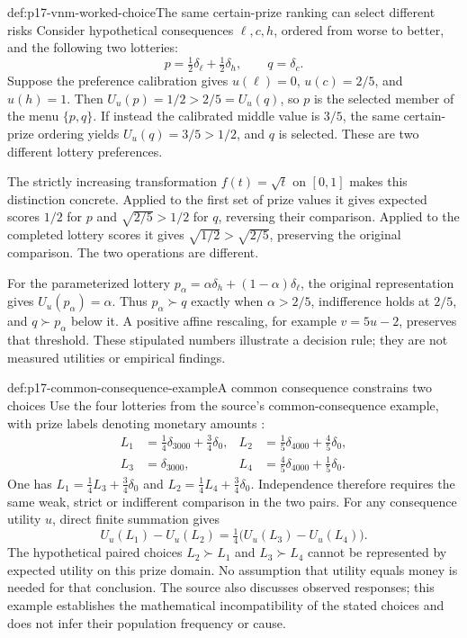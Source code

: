 \begin{hbexample}{def:p17-vnm-worked-choice}{The same certain-prize ranking can select different risks}
Consider hypothetical consequences \(\ell,c,h\), ordered from worse to
better, and the following two lotteries:
\[
                 p=\tfrac12\delta_\ell+\tfrac12\delta_h,
                 \qquad q=\delta_c.
\]
Suppose the preference calibration gives
\(u(\ell)=0\), \(u(c)=2/5\), and \(u(h)=1\). Then
\(U_u(p)=1/2>2/5=U_u(q)\), so \(p\) is the selected member of
the menu \(\{p,q\}\). If instead the calibrated middle value is
\(3/5\), the same certain-prize ordering yields \(U_u(q)=3/5>1/2\),
and \(q\) is selected. These are two different lottery preferences.

The strictly increasing transformation \(f(t)=\sqrt t\) on \([0,1]\) makes this
distinction concrete. Applied to the first set of prize values it gives
expected scores \(1/2\) for \(p\) and \(\sqrt{2/5}>1/2\) for \(q\),
reversing their comparison. Applied to the completed lottery scores it gives
\(\sqrt{1/2}>\sqrt{2/5}\), preserving the original comparison.
The two operations are different.

For the parameterized lottery
\(p_\alpha=\alpha\delta_h+(1-\alpha)\delta_\ell\), the original
representation gives \(U_u(p_\alpha)=\alpha\). Thus
\(p_\alpha\succ q\) exactly when \(\alpha>2/5\), indifference holds
at \(2/5\), and \(q\succ p_\alpha\) below it. A positive affine
rescaling, for example \(v=5u-2\), preserves that threshold.
These stipulated numbers illustrate a decision rule; they are not measured
utilities or empirical findings.
\end{hbexample}

\begin{hbexample}{def:p17-common-consequence-example}{A common consequence constrains two choices}
Use the four lotteries from the source's common-consequence example,
with prize labels denoting monetary amounts
\cite[p.~101]{Rubinstein2015LectureNotes}:
\[
\begin{aligned}
 L_1&=\tfrac14\delta_{3000}+\tfrac34\delta_0,&
 L_2&=\tfrac15\delta_{4000}+\tfrac45\delta_0,\\
 L_3&=\delta_{3000},&
 L_4&=\tfrac45\delta_{4000}+\tfrac15\delta_0.
\end{aligned}
\]
One has \(L_1=\tfrac14L_3+\tfrac34\delta_0\) and
\(L_2=\tfrac14L_4+\tfrac34\delta_0\). Independence therefore requires
the same weak, strict or indifferent comparison in the two pairs.
For any consequence utility \(u\), direct finite summation gives
\[
                  U_u(L_1)-U_u(L_2)
                    =\tfrac14\bigl(U_u(L_3)-U_u(L_4)\bigr).
\]
The hypothetical paired choices \(L_2\succ L_1\) and \(L_3\succ L_4\)
cannot be represented by expected utility on this prize domain. No
assumption that utility equals money is needed for that conclusion.
The source also discusses observed responses; this example establishes
the mathematical incompatibility of the stated choices and does not
infer their population frequency or cause.
\end{hbexample}

